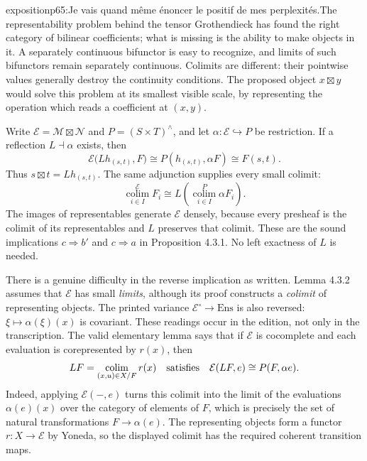 
\begin{dcomment}{exposition}{p65:Je vais quand même énoncer le positif de mes perplexités.}{The representability problem behind the tensor}
Grothendieck has found the right category of bilinear coefficients; what is missing is the ability to make objects in it.  A separately continuous bifunctor is easy to recognize, and limits of such bifunctors remain separately continuous.  Colimits are different: their pointwise values generally destroy the continuity conditions.  The proposed object $x\boxtimes y$ would solve this problem at its smallest visible scale, by representing the operation which reads a coefficient at $(x,y)$.

Write $\mathcal E=\mathcal M\boxtimes\mathcal N$ and $P=(S\times T)^\wedge$, and let $\alpha:\mathcal E\hookrightarrow P$ be restriction.  If a reflection $L\dashv\alpha$ exists, then
\[
 \mathcal E\bigl(Lh_{(s,t)},F\bigr)
 \cong P(h_{(s,t)},\alpha F)
 \cong F(s,t).
\]
Thus $s\boxtimes t=Lh_{(s,t)}$.  The same adjunction supplies every small colimit:
\[
 \operatorname*{colim}_{i\in I}^{\mathcal E}F_i
 \cong L\!\left(\operatorname*{colim}_{i\in I}^{P}\alpha F_i\right).
\]
The images of representables generate $\mathcal E$ densely, because every presheaf is the colimit of its representables and $L$ preserves that colimit.  These are the sound implications $c\Rightarrow b'$ and $c\Rightarrow a$ in Proposition 4.3.1.  No left exactness of $L$ is needed.

There is a genuine difficulty in the reverse implication as written.  Lemma 4.3.2 assumes that $\mathcal E$ has small \emph{limits}, although its proof constructs a \emph{colimit} of representing objects.  The printed variance $\mathcal E^\circ\to\mathrm{Ens}$ is also reversed: $\xi\mapsto\alpha(\xi)(x)$ is covariant.  These readings occur in the edition, not only in the transcription.  The valid elementary lemma says that if $\mathcal E$ is cocomplete and each evaluation is corepresented by $r(x)$, then
\[
 LF=\operatorname*{colim}_{(x,u)\in X/F}r(x)
 \quad\hbox{satisfies}\quad
 \mathcal E(LF,e)\cong P(F,\alpha e).
\]
Indeed, applying $\mathcal E(-,e)$ turns this colimit into the limit of the evaluations $\alpha(e)(x)$ over the category of elements of $F$, which is precisely the set of natural transformations $F\to\alpha(e)$.  The representing objects form a functor $r:X\to\mathcal E$ by Yoneda, so the displayed colimit has the required coherent transition maps.


\end{dcomment}
